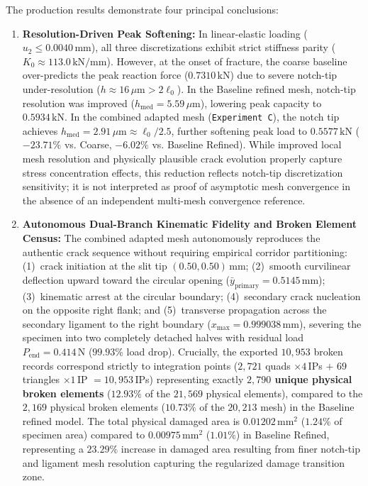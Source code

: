 The production results demonstrate four principal conclusions:
\begin{enumerate}
  \item \textbf{Resolution-Driven Peak Softening:} In linear-elastic loading ($u_2 \le 0.0040\,\mathrm{mm}$), all three discretizations exhibit strict stiffness parity ($K_0 \approx 113.0\,\mathrm{kN/mm}$). However, at the onset of fracture, the coarse baseline over-predicts the peak reaction force ($0.7310\,\mathrm{kN}$) due to severe notch-tip under-resolution ($h \approx 16\,\mu\mathrm{m} > 2\ell_0$). In the Baseline refined mesh, notch-tip resolution was improved ($h_{\mathrm{med}} = 5.59\,\mu\mathrm{m}$), lowering peak capacity to $0.5934\,\mathrm{kN}$. In the combined adapted mesh (\texttt{Experiment C}), the notch tip achieves $h_{\mathrm{med}} = 2.91\,\mu\mathrm{m} \approx \ell_0/2.5$, further softening peak load to \textbf{$0.5577\,\mathrm{kN}$} ($-23.71\%$ vs. Coarse, $-6.02\%$ vs. Baseline Refined). While improved local mesh resolution and physically plausible crack evolution properly capture stress concentration effects, this reduction reflects notch-tip discretization sensitivity; it is not interpreted as proof of asymptotic mesh convergence in the absence of an independent multi-mesh convergence reference.
  \item \textbf{Autonomous Dual-Branch Kinematic Fidelity and Broken Element Census:} The combined adapted mesh autonomously reproduces the authentic crack sequence without requiring empirical corridor partitioning: (1)~crack initiation at the slit tip $(0.50, 0.50)\,\mathrm{mm}$; (2)~smooth curvilinear deflection upward toward the circular opening ($\bar{y}_{\mathrm{primary}} = 0.5145\,\mathrm{mm}$); (3)~kinematic arrest at the circular boundary; (4)~secondary crack nucleation on the opposite right flank; and (5)~transverse propagation across the secondary ligament to the right boundary ($x_{\max} = 0.999038\,\mathrm{mm}$), severing the specimen into two completely detached halves with residual load $P_{\mathrm{end}} = 0.414\,\mathrm{N}$ ($99.93\%$ load drop). Crucially, the exported $10{,}953$ broken records correspond strictly to integration points ($2{,}721$ quads $\times 4$\,IPs $+$ $69$ triangles $\times 1$\,IP $= 10{,}953$\,IPs) representing exactly \textbf{$2{,}790$ unique physical broken elements} ($12.93\%$ of the $21{,}569$ physical elements), compared to the $2{,}169$ physical broken elements ($10.73\%$ of the $20{,}213$ mesh) in the Baseline refined model. The total physical damaged area is $0.01202\,\mathrm{mm}^2$ ($1.24\%$ of specimen area) compared to $0.00975\,\mathrm{mm}^2$ ($1.01\%$) in Baseline Refined, representing a $23.29\%$ increase in damaged area resulting from finer notch-tip and ligament mesh resolution capturing the regularized damage transition zone.

\end{enumerate}
